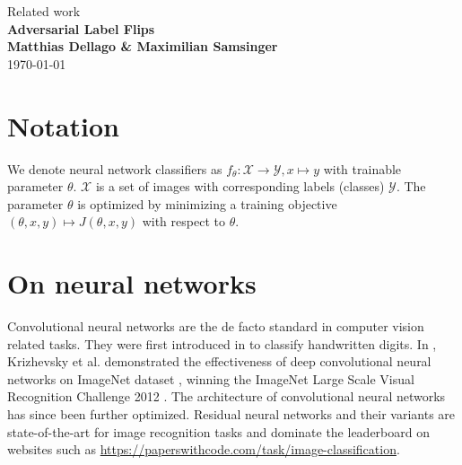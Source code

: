 \documentclass{article}
\begin{document}
\begin{titlepage}
	\noindent{}
	\vspace{3cm}
	\begin{center}
		{\Large Related work}
		\vspace{50pt}\\
		\textbf{\Huge Adversarial Label Flips}
		\vspace{40pt}\\
		\textbf{\Large Matthias Dellago \& Maximilian Samsinger}\vspace{20pt}\\
		{\large\today}
		\vspace{120pt}
	\end{center}
\end{titlepage}
	
	\DeclarePairedDelimiter\abs{\lvert}{\rvert}%
	\DeclarePairedDelimiter\norm{\lVert}{\rVert}%
	\DeclarePairedDelimiter\ceil{\lceil}{\rceil}
	\DeclarePairedDelimiter\floor{\lfloor}{\rfloor}

\section{Notation}
We denote neural network classifiers as ${f_\theta\colon\mathcal{X}\to\mathcal{Y}, x\mapsto y}$ with trainable parameter $\theta$. $\mathcal{X}$ is a set of images with corresponding labels (classes) $\mathcal{Y}$. The parameter $\theta$ is optimized by minimizing a training objective ${(\theta, x, y) \mapsto J(\theta, x, y)}$ with respect to $\theta$.

\section{On neural networks}	
Convolutional neural networks are the de facto standard in computer vision related tasks. They were first introduced in \cite{lecun1989backpropagation} to classify handwritten digits. In
\cite{krizhevsky2012imagenet}, Krizhevsky et al. demonstrated the effectiveness of deep convolutional neural networks on ImageNet dataset \cite{deng2009imagenet}, winning the ImageNet Large Scale Visual Recognition Challenge 2012 \cite{ILSVRC15}. The architecture of convolutional neural networks has since been further optimized. Residual neural networks \cite{he2016deep} and their variants are state-of-the-art for image recognition tasks and dominate the leaderboard on websites such as \url{https://paperswithcode.com/task/image-classification}.
\end{document}
